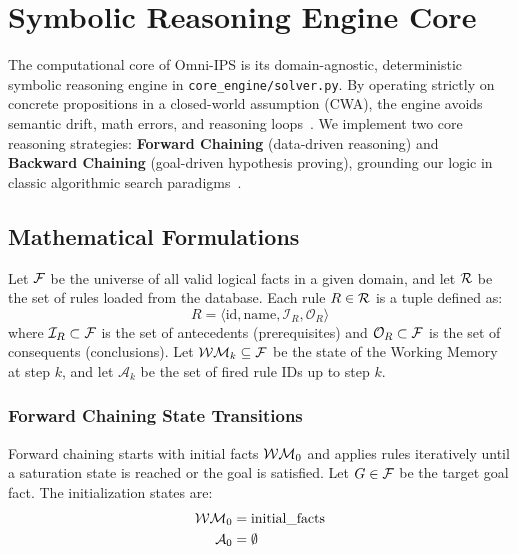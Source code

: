 \section{Symbolic Reasoning Engine Core}
\label{sec:reasoning_engine}

The computational core of Omni-IPS is its domain-agnostic, deterministic symbolic reasoning engine in \texttt{core\_engine/solver.py}. By operating strictly on concrete propositions in a closed-world assumption (CWA), the engine avoids semantic drift, math errors, and reasoning loops~\cite{raedt2020neuro}. We implement two core reasoning strategies: \textbf{Forward Chaining} (data-driven reasoning) and \textbf{Backward Chaining} (goal-driven hypothesis proving), grounding our logic in classic algorithmic search paradigms~\cite{russell2020artificial}.

\subsection{Mathematical Formulations}
Let $\mathcal{F}$ be the universe of all valid logical facts in a given domain, and let $\mathcal{R}$ be the set of rules loaded from the database. Each rule $R \in \mathcal{R}$ is a tuple defined as:
\begin{equation}
    R = \langle \text{id}, \text{name}, \mathcal{I}_R, \mathcal{O}_R \rangle
\end{equation}
where $\mathcal{I}_R \subset \mathcal{F}$ is the set of antecedents (prerequisites) and $\mathcal{O}_R \subset \mathcal{F}$ is the set of consequents (conclusions). Let $\mathcal{WM}_k \subseteq \mathcal{F}$ be the state of the Working Memory at step $k$, and let $\mathcal{A}_k$ be the set of fired rule IDs up to step $k$.

\subsubsection{Forward Chaining State Transitions}
Forward chaining starts with initial facts $\mathcal{WM}_0$ and applies rules iteratively until a saturation state is reached or the goal is satisfied.
Let $G \in \mathcal{F}$ be the target goal fact. The initialization states are:
\begin{align}
    \mathcal{WM}_0 &= \text{initial\_facts} \\
    \mathcal{A}_0 &= \emptyset
\end{align}

